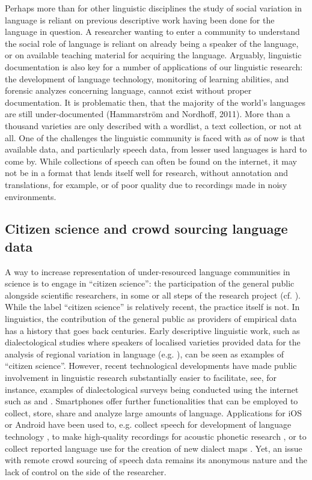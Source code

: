 \documentclass[output=paper,hidelinks]{langscibook}
\begin{document}
Perhaps more than for other linguistic disciplines the study of social variation in language is reliant on previous descriptive work having been done for the language in question. A researcher wanting to enter a community to understand the social role of language is reliant on already being a speaker of the language, or on available teaching material for acquiring the language. Arguably, linguistic documentation is also key for a number of applications of our linguistic research: the development of language technology, monitoring of learning abilities, and forensic analyzes concerning language, cannot exist without proper documentation. It is problematic then, that the majority of the world’s languages are still under-documented (Hammarström and Nordhoff, 2011). More than a thousand varieties are only described with a wordlist, a text collection, or not at all. One of the challenges the linguistic community is faced with as of now is that available data, and particularly speech data, from lesser used languages is hard to come by. While collections of speech can often be found on the internet, it may not be in a format that lends itself well for research, without annotation and translations, for example, or of poor quality due to recordings made in noisy environments.

\subsection{Citizen science and crowd sourcing language data}

A way to increase representation of under-resourced language communities in science is to engage in “citizen science”: the participation of the general public alongside scientific researchers, in some or all steps of the research project (cf. \citealt{bonney2016can}). While the label “citizen science” is relatively recent, the practice itself is not. In linguistics, the contribution of the general public as providers of empirical data has a history that goes back centuries. Early descriptive linguistic work, such as dialectological studies where speakers of localised varieties provided data for the analysis of regional variation in language (e.g. \citealt{wenker1881sprach}), can be seen as examples of “citizen science”. However, recent technological developments have made public involvement in linguistic research substantially easier to facilitate, see, for instance, examples of dialectological surveys being conducted using the internet such as \citet{vaux2004american} and \citet{moller201521}. Smartphones offer further functionalities that can be employed to collect, store, share and analyze large amounts of language. Applications for iOS or Android have been used to, e.g. collect speech for development of language technology \citep{de2014smartphone}, to make high-quality recordings for acoustic phonetic research \citep{de2011record}, or to collect reported language use for the creation of new dialect maps \citep{kolly2015dialakt}. Yet, an issue with remote crowd sourcing of speech data remains its anonymous nature and the lack of control on the side of the researcher. 
\end{document}
